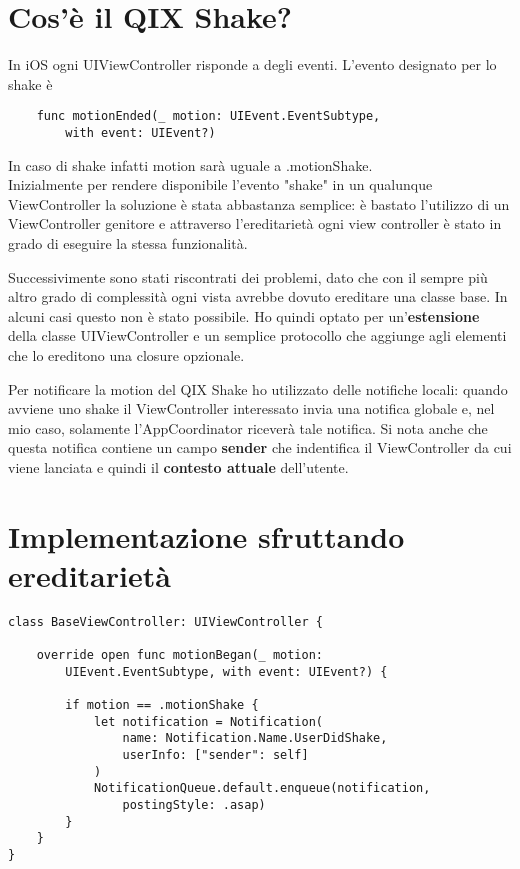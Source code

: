
\section{Cos'è il QIX Shake?}

In iOS ogni UIViewController risponde a degli eventi. L'evento designato per lo shake è
\begin{verbatim}
    func motionEnded(_ motion: UIEvent.EventSubtype,
        with event: UIEvent?)
\end{verbatim}

In caso di shake infatti motion sarà uguale a .motionShake. \\

Inizialmente per rendere disponibile l'evento "shake" in un qualunque ViewController la soluzione è stata abbastanza semplice:
è bastato l'utilizzo di un ViewController genitore e attraverso l'ereditarietà ogni view controller è stato in grado
di eseguire la stessa funzionalità.

Successivimente sono stati riscontrati dei problemi, dato che con il sempre più altro grado di complessità
ogni vista avrebbe dovuto ereditare una classe base. In alcuni casi questo non è stato possibile. Ho quindi optato 
per un'\textbf{estensione} della classe UIViewController e un semplice protocollo che aggiunge agli elementi che lo ereditono
una closure opzionale.

Per notificare la motion del QIX Shake ho utilizzato delle notifiche locali: quando avviene uno shake il ViewController interessato invia 
una notifica globale e, nel mio caso, solamente l'AppCoordinator riceverà tale notifica.
Si nota anche che questa notifica contiene un campo \textbf{sender} che indentifica il ViewController da cui viene lanciata e quindi
il \textbf{contesto attuale} dell'utente.

\section{Implementazione sfruttando ereditarietà}

\begin{verbatim}
class BaseViewController: UIViewController {

    override open func motionBegan(_ motion:
        UIEvent.EventSubtype, with event: UIEvent?) {
            
        if motion == .motionShake {
            let notification = Notification(
                name: Notification.Name.UserDidShake,
                userInfo: ["sender": self]
            )
            NotificationQueue.default.enqueue(notification,
                postingStyle: .asap)
        }
    }
}
\end{verbatim}

